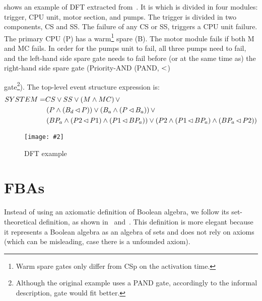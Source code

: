 \documentclass[en,twoside,onehalfspacing,phd]{risethesis}
\newcommand{\includegraphicsaspectratio}[2][1]{%
  \texttt{[image: \#2]}%
}
\def\pandtext{Priority-AND (PAND, $\pand$)%
  \gdef\pandtext{PAND\xspace}%
  \xspace
}
\newcommand{\parsin}[1]{\ensuremath\left( #1 \right)}
\def\pand{\ensuremath\operatorname{<}}
\def\nibefore{\ensuremath\operatorname{\lhd}}
\begin{document}

 shows an example of \ac{DFT} extracted from~\cite{MRL2014}.
It is  which is divided in four modules: trigger, CPU unit, motor section, and pumps.
The trigger is divided in two components, CS and SS.
The failure of any CS or SS, triggers a CPU unit failure.
The primary CPU (P) has a warm\footnote{Warm spare gates only differ from \ac{CSp} on the activation time.} spare (B).
The motor module fails if both M and MC fails.
In order for the pumps unit to fail, all three pumps need to fail, and the left-hand side spare gate needs to fail before (or at the same time as) the right-hand side spare gate (\pandtext gate\footnote{Although the original example uses a \pandtext gate, accordingly to the informal description,  gate would fit better.}).
The top-level event structure expression is:
\begin{align}
SYSTEM =& CS \lor SS \lor \parsin{M \land MC} \lor \\
  &\parsin{P \land \parsin{B_d \nibefore P}} \lor \parsin{B_a \land \parsin{P \nibefore B_a}} \lor \nonumber\\
  &\parsin{BP_a \land \parsin{P2 \nibefore P1} \land \parsin{P1 \nibefore BP_a}} \lor
  \parsin{P2 \land \parsin{P1 \nibefore BP_a} \land \parsin{BP_a \nibefore P2}}\nonumber
\end{align}

\begin{figure}[t]
  \centering
  \includegraphicsaspectratio[0.65]{dft-example-mrl2014}
  \caption{\Ac{DFT} example}
  \label{fig:dft-example}
\end{figure}


\section[Free Boolean Algebras]{\Aclp*{FBA}}
\label{sec:fba}

Instead of using an axiomatic definition of Boolean algebra, we follow its set-theoretical definition, as shown in~\cite[pp. 254--258]{Stoll1979} and~\cite[pp. 8--11]{GH2009}.
This definition is more elegant because it represents a Boolean algebra as an algebra of sets and does not rely on axioms (which can be misleading, case there is a unfounded axiom).
\end{document}
